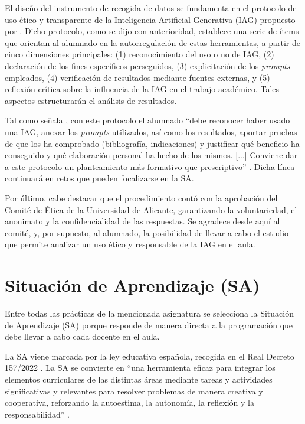 \documentclass[spanish]{textolivre}
\begin{document}
El diseño del instrumento de recogida de datos se fundamenta en el protocolo de uso ético y transparente de la Inteligencia Artificial Generativa (IAG) propuesto por \textcite{Cassany2024}. Dicho protocolo, como se dijo con anterioridad, establece una serie de ítems que orientan al alumnado en la autorregulación de estas herramientas, a partir de cinco dimensiones principales: (1) reconocimiento del uso o no de IAG, (2) declaración de los fines específicos perseguidos, (3) explicitación de los \textit{prompts} empleados, (4) verificación de resultados mediante fuentes externas, y (5) reflexión crítica sobre la influencia de la IAG en el trabajo académico. Tales aspectos estructurarán el análisis de resultados.

Tal como señala \textcite{Cassany2024}, con este protocolo el alumnado “debe reconocer haber usado una IAG, anexar los \textit{prompts} utilizados, así como los resultados, aportar pruebas de que los ha comprobado (bibliografía, indicaciones) y justificar qué beneficio ha conseguido y qué elaboración personal ha hecho de los mismos. [...] Conviene dar a este protocolo un planteamiento más formativo que prescriptivo” \cite[p. 332]{Cassany2024}. Dicha línea continuará en retos \cite{CassanyCasarin2025} que pueden focalizarse en la SA.

Por último, cabe destacar que el procedimiento contó con la aprobación del Comité de Ética de la Universidad de Alicante, garantizando la voluntariedad, el anonimato y la confidencialidad de las respuestas. Se agradece desde aquí al comité, y, por supuesto, al alumnado, la posibilidad de llevar a cabo el estudio que permite analizar un uso ético y responsable de la IAG en el aula.

\section{Situación de Aprendizaje (SA)}\label{sec-modelo}
Entre todas las prácticas de la mencionada asignatura se selecciona la Situación de Aprendizaje (SA) porque responde de manera directa a la programación que debe llevar a cabo cada docente en el aula.

La SA viene marcada por la ley educativa española, recogida en el Real Decreto 157/2022 \cite{LOMLOE2022}. La SA se convierte en “una herramienta eficaz para integrar los elementos curriculares de las distintas áreas mediante tareas y actividades significativas y relevantes para resolver problemas de manera creativa y cooperativa, reforzando la autoestima, la autonomía, la reflexión y la responsabilidad” \cite[p. 108]{LOMLOE2022}.
\end{document}
